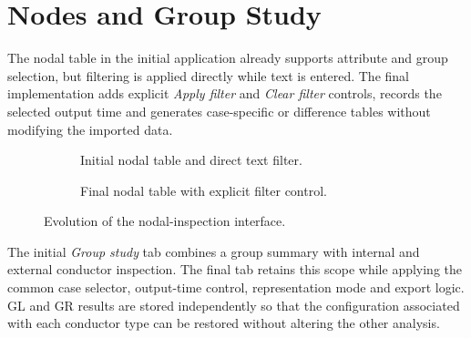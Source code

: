 \FloatBarrier

\section{Nodes and Group Study}
\label{appsec:nodes_group_study_evolution}

The nodal table in the initial application already supports attribute and
group selection, but filtering is applied directly while text is entered. The
final implementation adds explicit \textit{Apply filter} and
\textit{Clear filter} controls, records the selected output time and generates
case-specific or difference tables without modifying the imported data.

\begin{figure}[!htbp]
    \centering

    \begin{subfigure}[t]{0.96\textwidth}
        \centering
        \caption{Initial nodal table and direct text filter.}
        \label{fig:appendix_original_nodes}
    \end{subfigure}

    \vspace{0.8em}

    \begin{subfigure}[t]{0.96\textwidth}
        \centering
        \caption{Final nodal table with explicit filter control.}
        \label{fig:appendix_final_nodes}
    \end{subfigure}

    \caption{Evolution of the nodal-inspection interface.}
    \label{fig:appendix_nodes_evolution}
\end{figure}

\FloatBarrier

The initial \textit{Group study} tab combines a group summary with internal
and external conductor inspection. The final tab retains this scope while
applying the common case selector, output-time control, representation mode
and export logic. GL and GR results are stored independently so that the
configuration associated with each conductor type can be restored without
altering the other analysis.

